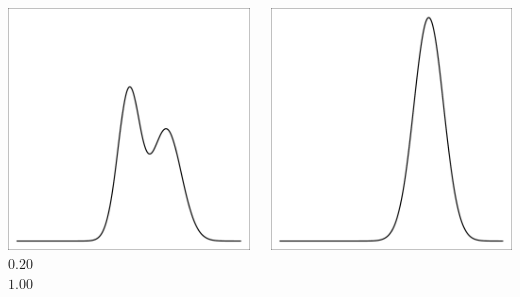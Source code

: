 \documentclass{beamer}
\begin{document}
\begin{frame}[t]
\begin{columns}[c]
\begin{flushright}
                \includegraphics[width=1\textwidth]{bayesian_update_illustration_th2.pdf}\\
                \vspace{10pt}
                \Large $0.20$\\
                \vspace{20pt}
                \Large $1.00$\\
            \end{flushright}
            \begin{flushright}
                \includegraphics[width=1\textwidth]{bayesian_update_illustration_th3.pdf}\\

\end{flushright}
\end{columns}
\end{frame}
\end{document}
